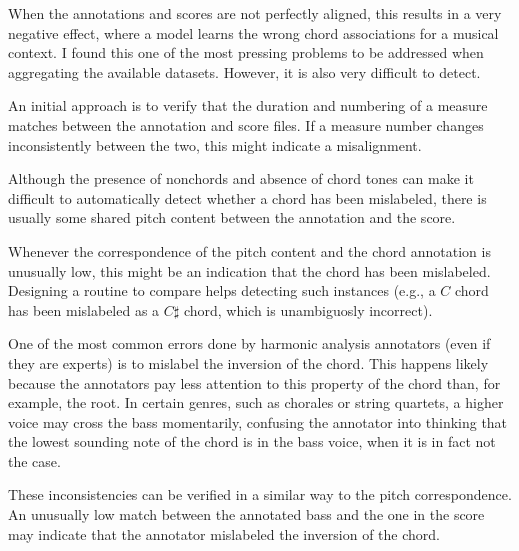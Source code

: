 



When the annotations and scores are not perfectly aligned,
this results in a very negative effect, where a model learns
the wrong chord associations for a musical context. I found
this one of the most pressing problems to be addressed when
aggregating the available datasets. However, it is also very
difficult to detect.

An initial approach is to verify that the duration and
numbering of a measure matches between the annotation and
score files. If a measure number changes inconsistently
between the two, this might indicate a misalignment.


Although the presence of \gls{nonchord}s and absence of
chord tones can make it difficult to automatically detect
whether a chord has been mislabeled, there is usually some
shared pitch content between the annotation and the score.

Whenever the correspondence of the pitch content and the
chord annotation is unusually low, this might be an
indication that the chord has been mislabeled. Designing a
routine to compare helps detecting such instances (e.g., a
$C$ chord has been mislabeled as a $C\sharp$ chord, which is
unambiguosly incorrect).



One of the most common errors done by harmonic analysis
annotators (even if they are experts) is to mislabel the
inversion of the chord. This happens likely because the
annotators pay less attention to this property of the chord
than, for example, the root. In certain genres, such as
chorales or string quartets, a higher voice may cross the
bass momentarily, confusing the annotator into thinking that
the lowest sounding note of the chord is in the bass voice,
when it is in fact not the case.

These inconsistencies can be verified in a similar way to
the pitch correspondence. An unusually low match between the
annotated bass and the one in the score may indicate that
the annotator mislabeled the inversion of the chord.
